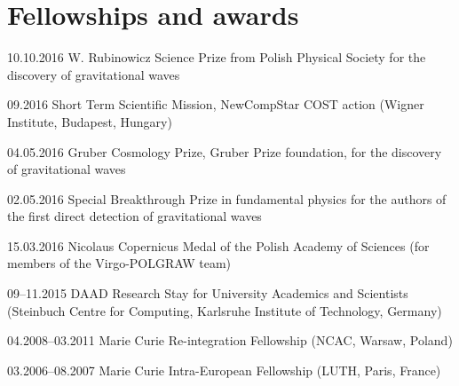 \documentclass[]{friggeri-cv} %
\begin{document}

\section{Fellowships and awards}

\begin{entrylistshort}

\entrys 
{10.10.2016}
{W. Rubinowicz Science Prize from Polish Physical Society for the discovery of gravitational waves}  

\entrys
{09.2016}
{Short Term Scientific Mission, NewCompStar COST action (Wigner Institute, Budapest, Hungary)}

\entrys 
{04.05.2016}
{Gruber Cosmology Prize, Gruber Prize foundation, for the discovery of gravitational waves}  

\entrys 
{02.05.2016}
{Special Breakthrough Prize in fundamental physics for the authors of the first direct detection of gravitational waves}  

\entrys
{15.03.2016} 
{Nicolaus Copernicus Medal of the Polish Academy of Sciences (for members of the Virgo-POLGRAW team)}   

\entrys
{09--11.2015} 
{DAAD Research Stay for University Academics and Scientists (Steinbuch Centre for Computing, Karlsruhe Institute of Technology, Germany)}  

\entrys 
{04.2008--03.2011} 
{Marie Curie Re-integration Fellowship (NCAC, Warsaw, Poland)}   

\entrys 
{03.2006--08.2007} 
{Marie Curie Intra-European Fellowship (LUTH, Paris, France)} 

\end{entrylistshort}





\pagebreak
\end{document}
